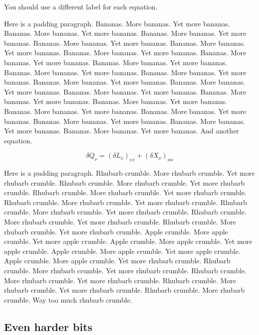 \documentclass[12pt,a4paper]{report}
\begin{document}
You should use a different label for each equation.

Here is a padding paragraph.  Bananas.  More bananas.  Yet more
bananas.  Bananas.  More bananas.  Yet more bananas.  Bananas.  More
bananas.  Yet more bananas.  Bananas.  More bananas.  Yet more
bananas.  Bananas.  More bananas.  Yet more bananas.  Bananas.  More
bananas.  Yet more bananas.  Bananas.  More bananas.  Yet more
bananas.  Bananas.  More bananas.  Yet more bananas.  Bananas.  More
bananas.  Yet more bananas.  Bananas.  More bananas.  Yet more
bananas.  Bananas.  More bananas.  Yet more bananas.  Bananas.  More
bananas.  Yet more bananas.  Bananas.  More bananas.  Yet more
bananas.  Bananas.  More bananas.  Yet more bananas.  Bananas.  More
bananas.  Yet more bananas.  Bananas.  More bananas.  Yet more
bananas.  Bananas.  More bananas.  Yet more bananas.  Bananas.  More
bananas.  Yet more bananas.  Bananas.  More bananas.  Yet more
bananas.  Bananas.  More bananas.  Yet more bananas. And another
equation.

\begin{equation}
  \delta Q_{\nu} = (\delta L_{\nu})_{ex} + (\delta X_{\nu})_{au} 
  \label{equation:delsplit4}
\end{equation}

Here is a pudding paragraph.  Rhubarb crumble.  More rhubarb crumble.
Yet more rhubarb crumble.  Rhubarb crumble.  More rhubarb crumble.
Yet more rhubarb crumble.  Rhubarb crumble.  More rhubarb crumble.
Yet more rhubarb crumble.  Rhubarb crumble.  More rhubarb crumble.
Yet more rhubarb crumble.  Rhubarb crumble.  More rhubarb crumble.
Yet more rhubarb crumble.  Rhubarb crumble.  More rhubarb crumble.
Yet more rhubarb crumble.  Rhubarb crumble.  More rhubarb crumble.
Yet more rhubarb crumble.  Apple crumble.  More apple crumble.
Yet more apple crumble.  Apple crumble.  More apple crumble.
Yet more apple crumble.  Apple crumble.  More apple crumble.
Yet more apple crumble.  Apple crumble.  More apple crumble.
Yet more rhubarb crumble.  Rhubarb crumble.  More rhubarb crumble.
Yet more rhubarb crumble.  Rhubarb crumble.  More rhubarb crumble.
Yet more rhubarb crumble.  Rhubarb crumble.  More rhubarb crumble.
Yet more rhubarb crumble.  Rhubarb crumble.  More rhubarb crumble.
Way too much rhubarb crumble.

\subsection{Even harder bits}
\end{document}
